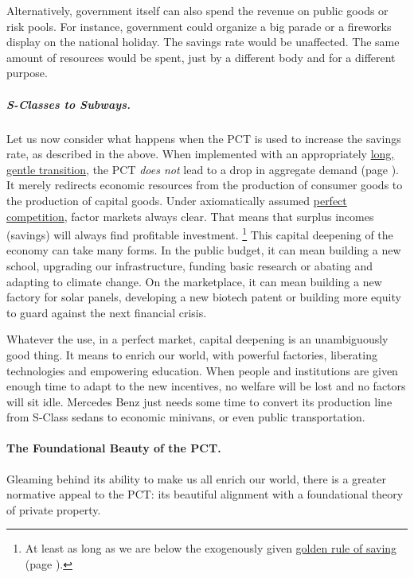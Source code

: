 Alternatively, government itself can also spend the revenue on public goods or risk pools.
For instance, government could organize a big parade or a fireworks display on the national holiday.
The savings rate would be unaffected.
The same amount of resources would be spent, just by a different body and for a different purpose.

\subparagraph{S-Classes to Subways.}
Let us now consider what happens when the PCT is used to increase the savings rate, as described in the above.
When implemented with an appropriately \hyperref[sec:GoSlow]{long, gentle transition}, the PCT \emph{does not} lead to a drop in aggregate demand (page \pageref{sec:GoSlow}).
It merely redirects economic resources from the production of consumer goods to the production of capital goods.
Under axiomatically assumed \hyperref[sec:PerfectCompetition]{perfect competition}, factor markets always clear.
That means that surplus incomes (savings) will always find profitable investment.
\footnote{
	At least as long as we are below the exogenously given \hyperref[eq:GoldenRuleSavings]{golden rule of saving} (page \pageref{eq:GoldenRuleSavings}).
}
This capital deepening of the economy can take many forms.
In the public budget, it can mean building a new school, upgrading our infrastructure, funding basic research or abating and adapting to climate change.
On the marketplace, it can mean building a new factory for solar panels, developing a new biotech patent or building more equity to guard against the next financial crisis.

Whatever the use, in a perfect market, capital deepening is an unambiguously good thing.
It means to enrich our world, with powerful
factories, liberating technologies and empowering education.
When people and institutions are given enough time to adapt to the new incentives, no welfare will be lost and no factors will sit idle.
Mercedes Benz just needs some time to convert its production line from S-Class sedans to economic minivans, or even public transportation.


\paragraph{The Foundational Beauty of the PCT.}
	\label{sec:FoundationalBeauty}
Gleaming behind its ability to make us all enrich our world, there is a greater normative appeal to the PCT:
its beautiful alignment with a foundational theory of private property.

